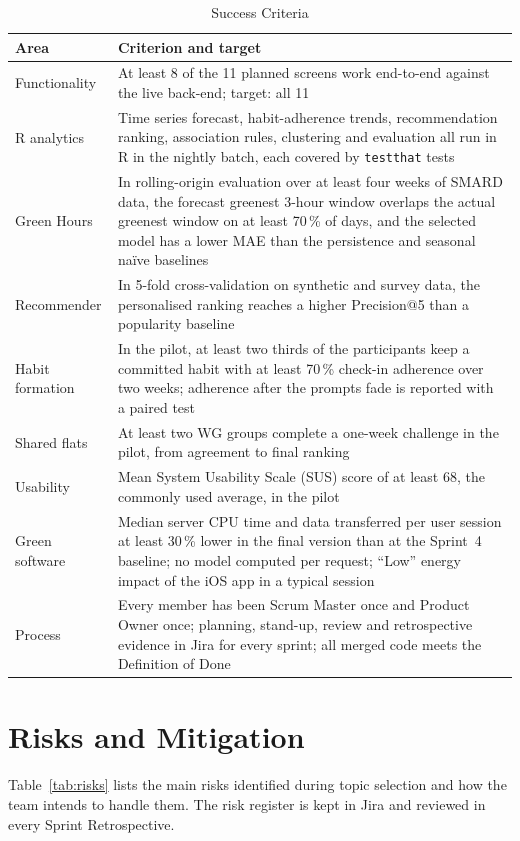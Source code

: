 \documentclass[conference]{IEEEtran}
\newcommand{\pkg}[1]{\texttt{#1}}
\begin{document}
\begin{table}[!t]
\caption{Success Criteria}
\label{tab:success}
\centering
\footnotesize
\begin{tabular}{@{}L{1.7cm}L{6.55cm}@{}}
\toprule
Area & Criterion and target \\
\midrule
Functionality & At least 8 of the 11 planned screens work end-to-end against the live back-end; target: all 11 \\
R analytics & Time series forecast, habit-adherence trends, recommendation ranking, association rules, clustering and evaluation all run in R in the nightly batch, each covered by \pkg{testthat} tests \\
Green Hours & In rolling-origin evaluation over at least four weeks of SMARD data, the forecast greenest 3-hour window overlaps the actual greenest window on at least 70\,\% of days, and the selected model has a lower MAE than the persistence and seasonal na\"ive baselines \\
Recommender & In 5-fold cross-validation on synthetic and survey data, the personalised ranking reaches a higher Precision@5 than a popularity baseline \\
Habit formation & In the pilot, at least two thirds of the participants keep a committed habit with at least 70\,\% check-in adherence over two weeks; adherence after the prompts fade is reported with a paired test \\
Shared flats & At least two WG groups complete a one-week challenge in the pilot, from agreement to final ranking \\
Usability & Mean System Usability Scale (SUS) score of at least 68, the commonly used average, in the pilot~\cite{sus} \\
Green software & Median server CPU time and data transferred per user session at least 30\,\% lower in the final version than at the Sprint~4 baseline; no model computed per request; ``Low'' energy impact of the iOS app in a typical session \\
Process & Every member has been Scrum Master once and Product Owner once; planning, stand-up, review and retrospective evidence in Jira for every sprint; all merged code meets the Definition of Done \\
\bottomrule
\end{tabular}
\end{table}

\section{Risks and Mitigation}
Table~\ref{tab:risks} lists the main risks identified during topic selection and how the team intends to handle them. The risk register is kept in Jira and reviewed in every Sprint Retrospective.
\end{document}
